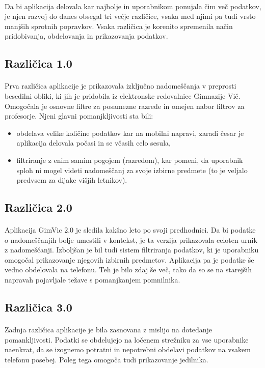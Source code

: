 \paragraph{}Da bi aplikacija delovala kar najbolje in uporabnikom ponujala čim več podatkov, je njen razvoj do danes obsegal tri večje različice, vsaka med njimi pa tudi vrsto manjših sprotnih popravkov. Vsaka različica je korenito spremenila način pridobivanja, obdelovanja in prikazovanja podatkov.

\subsection{Različica 1.0}
\paragraph{}Prva različica aplikacije je prikazovala izključno nadomeščanja v preprosti besedilni obliki, ki jih je pridobila iz elektronske redovalnice Gimnazije Vič. Omogočala je osnovne filtre za posamezne razrede in omejen nabor filtrov za profesorje. Njeni glavni pomanjkljivosti sta bili:
\begin{itemize}
  \setlength\itemsep{0em}
  \item obdelava velike količine podatkov kar na mobilni napravi, zaradi česar je aplikacija delovala počasi in se včasih celo sesula,
  \item filtriranje z enim samim pogojem (razredom), kar pomeni, da uporabnik sploh ni mogel videti nadomeščanj za svoje izbirne predmete (to je veljalo predvsem za dijake višjih letnikov).
\end{itemize}

\subsection{Različica 2.0}
\paragraph{} Aplikacija GimVic 2.0 je sledila kakšno leto po svoji predhodnici. Da bi podatke o nadomeščanjih bolje umestili v kontekst, je ta verzija prikazovala celoten urnik z nadomeščanji. Izboljšan je bil tudi sistem filtriranja podatkov, ki je uporabniku omogočal prikazovanje njegovih izbirnih predmetov. Aplikacija pa je podatke še vedno obdelovala na telefonu. Teh je bilo zdaj še več, tako da so se na starejših napravah pojavljale težave s pomanjkanjem pomnilnika.

\subsection{Različica 3.0}
\paragraph{} Zadnja različica aplikacije je bila zasnovana z mislijo na dotedanje pomankljivosti. Podatki se obdelujejo na ločenem strežniku za vse uporabnike naenkrat, da se izognemo potratni in nepotrebni obdelavi podatkov na vsakem telefonu posebej. Poleg tega omogoča tudi prikazovanje jedilnika.
